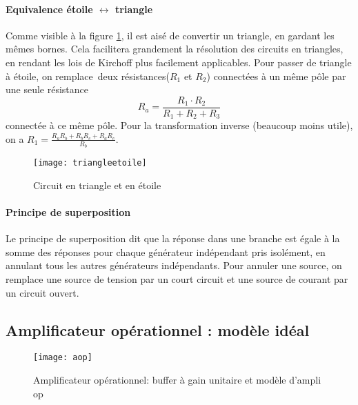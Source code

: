 \paragraph{Equivalence étoile $\longleftrightarrow$ triangle}
Comme visible à la figure \ref{triangle}, il est aisé de convertir un triangle, en gardant les mêmes bornes. Cela facilitera grandement la résolution des circuits en triangles, en rendant les lois de Kirchoff plus facilement applicables.
Pour passer de triangle à étoile, on remplace\footnotemark\ deux résistances($R_1$ et $R_2$) connectées à un même pôle par une seule résistance $$R_a = \frac{R_1\cdot R_2}{R_1+R_2+R_3}$$ connectée à ce même pôle. Pour la transformation inverse (beaucoup moins utile), on a $R_1 = \frac{R_aR_b + R_bR_c + R_aR_c}{R_b}$.
\begin{figure}[H]
\centering
\texttt{[image: triangleetoile]}
\caption{Circuit en triangle et en étoile}
\label{triangle}
\end{figure}
\paragraph{Principe de superposition} Le principe de superposition dit que la réponse dans une branche est égale à la somme des réponses pour chaque générateur indépendant pris isolément, en annulant tous les autres générateurs indépendants. Pour annuler une source, on remplace une source de tension par un court circuit et une source de courant par un circuit ouvert.

\subsection{Amplificateur opérationnel : modèle idéal}
\begin{figure}[h]
\centering
\texttt{[image: aop]}
\caption{Amplificateur opérationnel: buffer à gain unitaire et modèle d'ampli op}
\label{fig:aop}
\end{figure}

